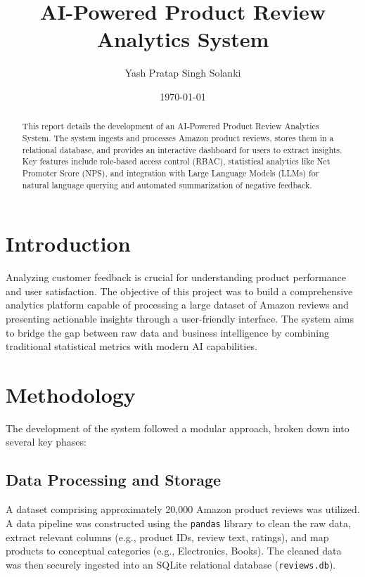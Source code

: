 \documentclass[12pt,a4paper]{article}
\title{\textbf{AI-Powered Product Review Analytics System}}
\author{Yash Pratap Singh Solanki}
\date{\today}
\begin{document}
\maketitle

\begin{abstract}
This report details the development of an AI-Powered Product Review Analytics System. The system ingests and processes Amazon product reviews, stores them in a relational database, and provides an interactive dashboard for users to extract insights. Key features include role-based access control (RBAC), statistical analytics like Net Promoter Score (NPS), and integration with Large Language Models (LLMs) for natural language querying and automated summarization of negative feedback.
\end{abstract}

\section{Introduction}
Analyzing customer feedback is crucial for understanding product performance and user satisfaction. The objective of this project was to build a comprehensive analytics platform capable of processing a large dataset of Amazon reviews and presenting actionable insights through a user-friendly interface. The system aims to bridge the gap between raw data and business intelligence by combining traditional statistical metrics with modern AI capabilities.

\section{Methodology}
The development of the system followed a modular approach, broken down into several key phases:

\subsection{Data Processing and Storage}
A dataset comprising approximately 20,000 Amazon product reviews was utilized. A data pipeline was constructed using the \texttt{pandas} library to clean the raw data, extract relevant columns (e.g., product IDs, review text, ratings), and map products to conceptual categories (e.g., Electronics, Books). The cleaned data was then securely ingested into an SQLite relational database (\texttt{reviews.db}).
\end{document}
